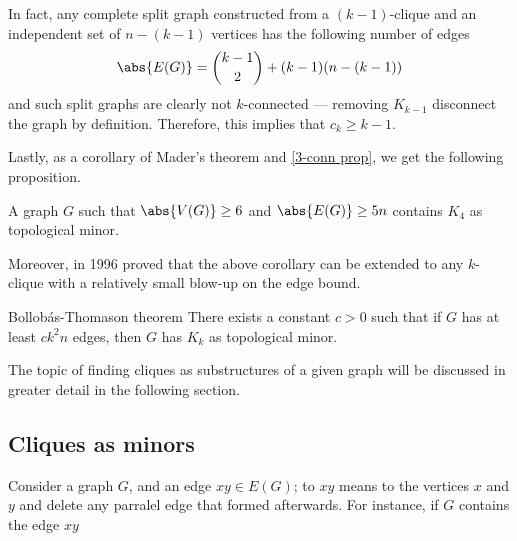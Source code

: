 \documentclass[a4paper, 12pt]{report}
\begin{document}
    In fact, any complete split graph constructed from a $(k - 1)$-clique and an independent set of $n - (k - 1)$ vertices has the following number of edges $$\abs{E(G)} = \binom{k - 1}{2} +  (k - 1)(n - (k - 1))$$ and such split graphs are clearly not $k$-connected --- removing $K_{k - 1}$ disconnect the graph by definition. Therefore, this implies that $c_k \ge k - 1$.

    Lastly, as a corollary of Mader's theorem and \cref{3-conn prop}, we get the following proposition.

    \begin{framedcor}{}
        A graph $G$ such that $\abs{V(G)} \ge 6$ and $\abs{E(G)} \ge 5n$ contains $K_4$ as topological minor.
    \end{framedcor}

    Moreover, in 1996 \textcite{bollobas} proved that the above corollary can be extended to any $k$-clique with a relatively small blow-up on the edge bound.

    \begin{framedthm}{Bollobás-Thomason theorem}
        There exists a constant $c > 0$ such that if $G$ has at least $ck^2n$ edges, then $G$ has $K_k$ as topological minor.
    \end{framedthm}

    The topic of finding cliques as substructures of a given graph will be discussed in greater detail in the following section.

    \subsection{Cliques as minors} \label{cliques as minors}

    Consider a graph $G$, and an edge $xy \in E(G)$; to  $xy$ means to  the vertices $x$ and $y$ and delete any parralel edge that formed afterwards. For instance, if $G$ contains the edge $xy$

    \begin{figure}[H]
        \centering
    \end{figure}
\end{document}
